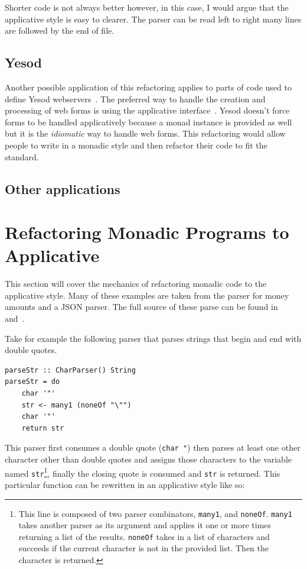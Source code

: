  Shorter code is not always better however, in this case,  I would argue that the applicative style is easy to clearer. The parser can be read left to right many lines are followed by the end of file.
 
\subsection{Yesod}
Another possible application of this refactoring applies to parts of code used to define Yesod webservers~\citep{yesod}. The preferred way to handle the creation and processing of web forms is using the applicative interface~\citep{yesodBook}. Yesod doesn't force forms to be handled applicatively because a monad instance is provided as well but it is the \textit{idiomatic} way to handle web forms. This refactoring would allow people to write in a monadic style and then refactor their code to fit the standard.

\subsection{Other applications}
  

\section{Refactoring Monadic Programs to Applicative}
\label{sec:appRefact}
This section will cover the mechanics of refactoring monadic code to the applicative style. Many of these examples are taken from the parser for money amounts and a JSON parser. The full source of these parse can be found in~\cite{moneyParse} and~\cite{jsonParser}.

Take for example the following parser that parses strings that begin and end with double quotes.

\begin{lstlisting}[frame=tlrb]
parseStr :: CharParser() String
parseStr = do
	char '"'
	str <- many1 (noneOf "\"")
	char '"'
	return str
\end{lstlisting}

This parser first consumes a double quote (\texttt{char \textquotesingle"\textquotesingle}) then parses at least one other character other than double quotes and assigns those characters to the variable named \texttt{str}\footnote{This line is composed of two parser combinators, \texttt{many1}, and \texttt{noneOf}. \texttt{many1} takes another parser as its argument and applies it one or more times returning a list of the results. \texttt{noneOf} takes in a list of characters and succeeds if the current character is not in the provided list. Then the character is returned.}, finally the closing quote is consumed and \texttt{str} is returned. This particular function can be rewritten in an applicative style like so:

